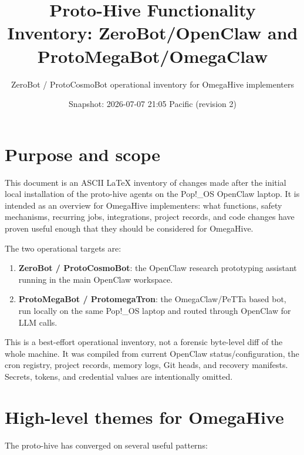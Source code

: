 \documentclass[11pt]{article}
\title{Proto-Hive Functionality Inventory: ZeroBot/OpenClaw and ProtoMegaBot/OmegaClaw}
\author{ZeroBot / ProtoCosmoBot operational inventory for OmegaHive implementers}
\date{Snapshot: 2026-07-07 21:05 Pacific (revision 2)}
\begin{document}
\maketitle

\section{Purpose and scope}

This document is an ASCII LaTeX inventory of changes made after the initial local installation of the proto-hive agents on the Pop!\_OS OpenClaw laptop.  It is intended as an overview for OmegaHive implementers: what functions, safety mechanisms, recurring jobs, integrations, project records, and code changes have proven useful enough that they should be considered for OmegaHive.

The two operational targets are:
\begin{enumerate}[label=\arabic*.]
  \item \textbf{ZeroBot / ProtoCosmoBot}: the OpenClaw research prototyping assistant running in the main OpenClaw workspace.
  \item \textbf{ProtoMegaBot / ProtomegaTron}: the OmegaClaw/PeTTa based bot, run locally on the same Pop!\_OS laptop and routed through OpenClaw for LLM calls.
\end{enumerate}

This is a best-effort operational inventory, not a forensic byte-level diff of the whole machine.  It was compiled from current OpenClaw status/configuration, the cron registry, project records, memory logs, Git heads, and recovery manifests.  Secrets, tokens, and credential values are intentionally omitted.

\section{High-level themes for OmegaHive}

The proto-hive has converged on several useful patterns:
\end{document}
